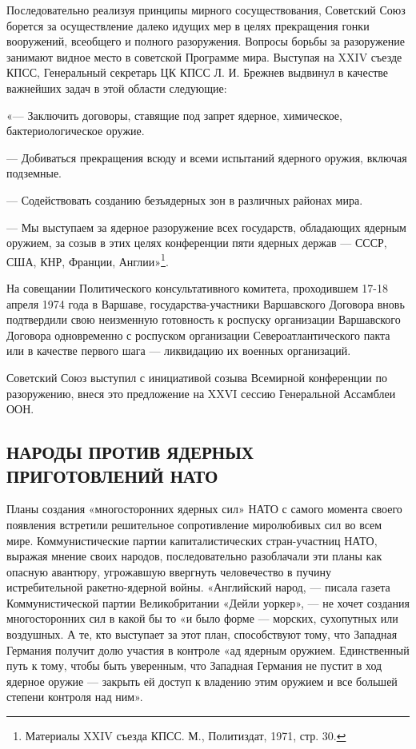 \documentclass[12pt, a4paper, openany]{book}
\begin{document}
	Последовательно реализуя принципы мирного сосуществования, Советский Союз борется за осуществление далеко идущих мер в целях прекращения гонки вооружений, всеобщего и полного разоружения. Вопросы борьбы за разоружение занимают видное место в советской Программе мира. Выступая на XXIV съезде КПСС, Генеральный секретарь ЦК КПСС Л. И. Брежнев выдвинул в качестве важнейших задач в этой области следующие:
	
	«— Заключить договоры, ставящие под запрет ядерное, химическое, бактериологическое оружие.
	
	— Добиваться прекращения всюду и всеми испытаний ядерного оружия, включая подземные. 
	
	— Содействовать созданию безъядерных зон в различных районах мира.
	
	— Мы выступаем за ядерное разоружение всех государств, обладающих ядерным оружием, за созыв в этих целях конференции пяти ядерных держав — СССР, США, КНР, Франции, Англии»{\footnote{Материалы XXIV съезда КПСС. М., Политиздат, 1971, стр. 30.}}.
	
	
	На совещании Политического консультативного комитета, проходившем 17-18 апреля 1974 года в Варшаве, государства-участники Варшавского Договора вновь подтвердили свою неизменную готовность к роспуску организации Варшавского Договора одновременно с роспуском организации Североатлантического пакта или в качестве первого шага — ликвидацию их военных организаций.
	
	Советский Союз выступил с инициативой созыва Всемирной конференции по разоружению, внеся это предложение на XXVI сессию Генеральной Ассамблеи ООН.
	
		\subsection[Народы против ядерных приготовлений НАТО]{\center НАРОДЫ ПРОТИВ ЯДЕРНЫХ ПРИГОТОВЛЕНИЙ НАТО}	
	
	
	Планы создания «многосторонних ядерных сил» НАТО с самого момента своего появления встретили решительное сопротивление миролюбивых сил во всем мире. Коммунистические партии капиталистических стран-участниц НАТО, выражая мнение своих народов, последовательно разоблачали эти планы как опасную авантюру, угрожавшую ввергнуть человечество в пучину истребительной ракетно-ядерной войны. «Английский народ, — писала газета Коммунистической партии Великобритании «Дейли уоркер», — не хочет создания многосторонних сил в какой бы то «и было форме — морских, сухопутных или воздушных. А те, кто выступает за этот план, способствуют тому, что Западная Германия получит долю участия в контроле «ад ядерным оружием. Единственный путь к тому, чтобы быть уверенным, что Западная Германия не пустит в ход ядерное оружие — закрыть ей доступ к владению этим оружием и все большей степени контроля над ним».
	
\end{document}
